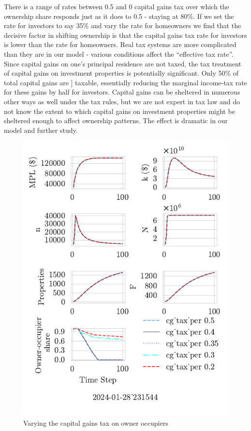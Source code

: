 \documentclass{article}
\begin{document}
There is a range of rates between 0.5 and 0 capital gains tax over which the ownership share responds just as it does to 0.5 -  staying at 80\%. If we set the rate for investors to say 35\% and vary the rate for homeowners we find that the decisive factor in shifting ownership is that the capital gains tax rate for investors is lower than the rate for homeowners.  Real tax systems are more complicated than they are in our model - various conditions affect the ``effective tax rate''. Since capital gains on one's principal residence are not taxed, the tax treatment of capital gains on investment properties is potentially significant. Only 50\% of total capital gains are ] taxable, essentially reducing the marginal income-tax rate for these gains by half for investors. Capital gains can be sheltered in numerous other ways as well under the tax rules, but we are not expert in tax law and do not know the extent to which capital gains on investment properties might be sheltered enough to affect ownership patterns. The effect is dramatic in our model and further study.%

\begin{figure}
    \centering
  \includegraphics{fig/Analysis/cg_tax_per-2024-01-28_231544}
    \caption{Varying the capital gains tax on owner occupiers}
    \label{fig:enter-label}
\end{figure}
\end{document}
